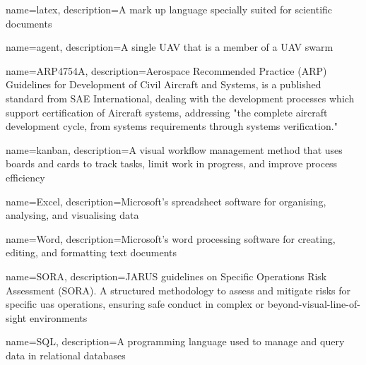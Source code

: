 %

\glstoctrue
\makeglossaries

{
        name=latex,
        description={A mark up language specially suited for scientific documents}
}

{
        name=agent,
        description={A single UAV that is a member of a UAV swarm}
}

{
        name=ARP4754A,
        description={Aerospace Recommended Practice (ARP) Guidelines for Development of Civil Aircraft and Systems, is a published standard from SAE International, dealing with the development processes which support certification of Aircraft systems, addressing "the complete aircraft development cycle, from systems requirements through systems verification."}
}

{
        name=kanban,
        description={A visual workflow management method that uses boards and cards to track tasks, limit work in progress, and improve process efficiency}
}

{
        name=Excel,
        description={Microsoft’s spreadsheet software for organising, analysing, and visualising data}
}

{
        name=Word,
        description={Microsoft’s word processing software for creating, editing, and formatting text documents}
}

{
        name=SORA,
        description={JARUS guidelines on Specific Operations Risk Assessment (SORA). A structured methodology to assess and mitigate risks for specific \acrshort{uas} operations, ensuring safe conduct in complex or beyond-visual-line-of-sight environments}
}

{
        name=SQL,
        description={A programming language used to manage and query data in relational databases}
}





